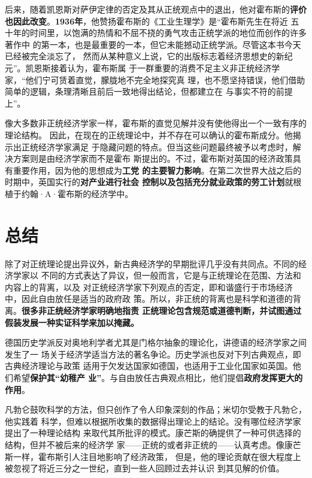 后来，随着凯恩斯对萨伊定律的否定及其从正统观点中的退出，他对霍布斯的\textbf{评价
  也因此改变}。\textbf{1936年}，他赞扬霍布斯的《工业生理学》是“霍布斯先生在将近
五十年的时间里，以饱满的热情和不屈不挠的勇气攻击正统学派的地位而创作的许多著作中
的第一本，也是最重要的一本，但它未能撼动正统学派。尽管这本书今天已经被完全淡忘了，
然而从某种意义上说，它的出版标志着经济思想史的新纪元”。凯恩斯接着认为，霍布斯属
于一群重要的消费不足主义非正统经济学家，“他们宁可赁着直觉，朦胧地不完全地探究真
理，也不愿坚持错误，他们借助简单的逻辑，条理清晰且前后一致地得出结论，但都建立在
与事实不符的前提上”。

像大多数非正统经济学家一样，霍布斯的直觉见解并没有使他得出一个一致有序的理论结构。
因此，在现在的正统理论中，并不存在可以确认的霍布斯成分。他揭示出正统经济学家满足
于隐藏问题的特点。但当这些问题最终被予以考虑时，解决方案则是由经济学家而不是霍布
斯提出的。不过，霍布斯对英国的经济政策具有重要作用，因为他的思想成为\textbf{工党
  的主要智力影响}。在第二次世界大战之后的时期中，英国实行的\textbf{对产业进行社会
  控制以及包括充分就业政策的劳工计划}就根植于约翰·A·霍布斯的经济学中。

\section{总结}

除了对正统理论提出异议外，新古典经济学的早期批评几乎没有共同点。不同的经济学家以
不同的方式表达了异议，但一般而言，它是与正统理论在范围、方法和内容上的背离，以及
对正统经济学家下列观点的否定，即和谐盛行于市场经济中，因此自由放任是适当的政府政
策。所以，非正统的背离也是科学和道德的背离。\textbf{很多非正统经济学家明确地指责
  正统理论包含规范或道德判断，并试图通过假装发展一种实证科学来加以掩藏。}

德国历史学派反对奥地利学者尤其是门格尔抽象的理论化，讲德语的经济学家之间发生了一
场关于经济学适当方法的著名争论。历史学派也反对下列古典观点，即古典经济理论与政策
适用于欠发达国家如德国，也适用于工业化国家如英国。他们希望\textbf{保护其“幼稚产
  业”}。与自由放任古典观点相比，他们提倡\textbf{政府发挥更大的作用}。

凡勃仑鼓吹科学的方法，但只创作了令人印象深刻的作品；米切尔受教于凡勃仑，他实践着
科学，但难以根据所收集的数据得出理论上的结论。没有哪位经济学家提出了一种理论结构
来取代其所批评的模式。康芒斯的确提供了一种可供选择的结构，但并不被后来的经济学
家——正统的或者非正统的——认真考虑。像康芒斯一样，霍布斯引人注目地影响了经济政策，
但是，他的理论贡献在很大程度上被忽视了将近三分之一世纪，直到一些人回顾过去并认识
到其见解的价值。

